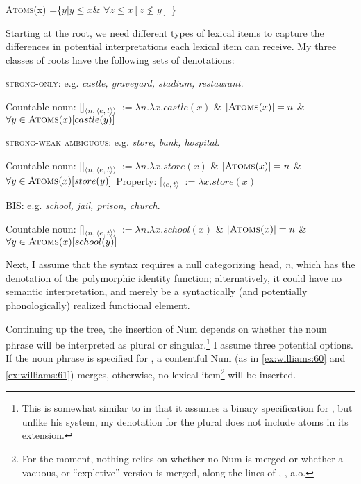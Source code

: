 \documentclass[output=paper,
modfonts
]{langscibook}
\begin{document}
\begin{exe}
	\ex \textsc{Atoms}(x) =\big\{$ y| y \leq x$\& $\forall z \leq x [ z \nleq  y ]$ \big\} \citep{Ouwayda2014}
\end{exe}

Starting at the root, we need different types of lexical items to capture the differences in potential interpretations each lexical item can receive. My three classes of roots have the following sets of denotations:

\begin{exe}
\ex \textsc{strong-only}: e.g. \textit{castle, graveyard, stadium, restaurant}.
	\begin{xlist}
	\ex Countable noun: [\!]\textsubscript{$\langle n, \langle e,t \rangle \rangle$}  $:= \lambda n.\lambda x. castle(x)$ \& $ \left|\textsc{Atoms}(x)\right| = n $ \& $ \forall y \in \textsc{Atoms}(x)[ castle(y) ]$
    \end{xlist}
\ex \textsc{strong-weak ambiguous}: e.g. \textit{store, bank, hospital}.
    \begin{xlist}
    \ex Countable noun: [\!]\textsubscript{$\langle n, \langle e,t \rangle \rangle$}  $:= \lambda n.\lambda x. store(x)$ \& $ \left|\textsc{Atoms}(x)\right| = n $ \& $ \forall y \in \textsc{Atoms}(x)[ store(y) ]$
	\ex Property: [\textsubscript{$\langle e,t \rangle$}  $:= \lambda x. store(x)$ 
    \end{xlist}
\ex \textsc{BIS}: e.g. \textit{school, jail, prison, church}.
    \begin{xlist}
		\ex Countable noun: [\!]\textsubscript{$\langle n, \langle e,t \rangle \rangle$}  $:= \lambda n.\lambda x. school(x)$ \& $ \left|\textsc{Atoms}(x)\right| = n $ \& $ \forall y \in \textsc{Atoms}(x)[ school(y) ]$
		\label{ex:williams:58}
    \end{xlist}
	\end{exe}

Next, I assume that the syntax requires a null categorizing head, \textit{n}, which has the denotation of the polymorphic identity function; alternatively, it could have no semantic interpretation, and merely be a syntactically (and potentially phonologically) realized functional element. 

Continuing up the tree, the insertion of Num depends on whether the noun phrase will be interpreted as plural or singular.\footnote{This is somewhat similar to \citet{sauerland2003} in that it assumes a binary specification for , but unlike his system, my denotation for the plural does not include atoms in its extension.} I assume three potential options. If the noun phrase is specified for , a contentful Num (as in \ref{ex:williams:60} and \ref{ex:williams:61}) merges, otherwise, no lexical item\footnote{For the moment, nothing relies on whether no Num is merged or whether a vacuous, or ``expletive'' version is merged, along the lines of \citet{Wood2012}, \citet{myler2014}, a.o.} will be inserted.
\end{document}
